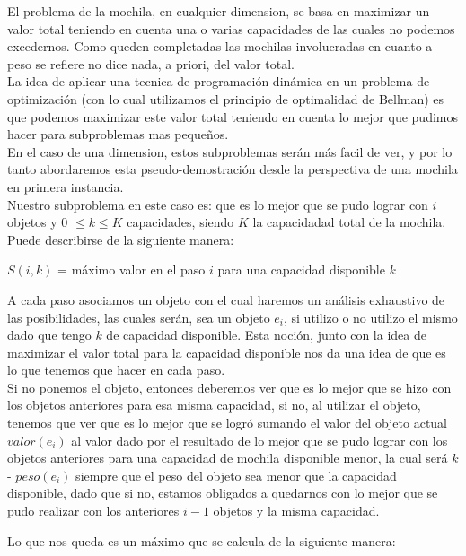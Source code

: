 El problema de la mochila, en cualquier dimension, se basa en maximizar un valor total teniendo en cuenta una o varias capacidades de las cuales no podemos excedernos. Como queden completadas las mochilas involucradas en cuanto a peso se refiere no dice nada, a priori, del valor total.\\

La idea de aplicar una tecnica de programación dinámica en un problema de optimización (con lo cual utilizamos el principio de optimalidad de Bellman) es que podemos maximizar este valor total teniendo en cuenta lo mejor que pudimos hacer para subproblemas mas pequeños.\\

En el caso de una dimension, estos subproblemas serán más facil de ver, y por lo tanto abordaremos esta pseudo-demostración desde la perspectiva de una mochila en primera instancia.\\

Nuestro subproblema en este caso es: que es lo mejor que se pudo lograr con $i$ objetos y 0 $\leq k \leq K$ capacidades, siendo $K$ la capacidadad total de la mochila.
Puede describirse de la siguiente manera:

\begin{center}
$S(i, k)$ = máximo valor en el paso $i$ para una capacidad disponible $k$
\end{center}

A cada paso asociamos un objeto con el cual haremos un análisis exhaustivo de las posibilidades, las cuales serán, sea un objeto $e_i$, si utilizo o no utilizo el mismo dado que tengo $k$ de capacidad disponible.
Esta noción, junto con la idea de maximizar el valor total para la capacidad disponible nos da una idea de que es lo que tenemos que hacer en cada paso. \\

Si no ponemos el objeto, entonces deberemos ver que es lo mejor que se hizo con los objetos anteriores para esa misma capacidad, si no, al utilizar el objeto, tenemos que ver que es lo mejor que se logró sumando el valor del objeto actual $valor(e_i)$ al valor dado por el resultado de lo mejor que se pudo lograr con los objetos anteriores para una capacidad de mochila disponible menor, la cual será $k$ - $peso(e_i)$ siempre que el peso del objeto sea menor que la capacidad disponible, dado que si no, estamos obligados a quedarnos con lo mejor que se pudo realizar con los anteriores $i-1$ objetos y la misma capacidad.

Lo que nos queda es un máximo que se calcula de la siguiente manera:

